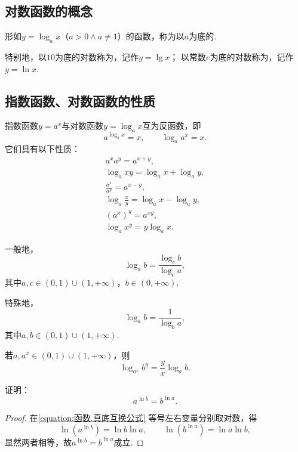 \subsection{对数函数的概念}
\begin{definition}[对数函数]
形如\(y=\log_a x\)（\(a>0 \land a \neq 1\)）的函数，称为以\(a\)为底的.

特别地，以\(10\)为底的对数称为，记作\(y = \lg x\)；
以常数\(e\)为底的对数称为，记作\(y = \ln x\).
\end{definition}

\subsection{指数函数、对数函数的性质}
\begin{property}
指数函数\(y = a^x\)与对数函数\(y = \log_a x\)互为反函数，即\[
	a^{\log_a x} = x, \qquad
	\log_a a^x = x.
\]
它们具有以下性质：
\begin{gather}
	a^x a^y = a^{x+y}, \\
	\log_a xy = \log_a x + \log_a y, \\
	\frac{a^x}{a^y} = a^{x-y}, \\
	\log_a \frac{x}{y} = \log_a x - \log_a y, \\
	(a^x)^y = a^{xy}, \\
	\log_a x^y = y \log_a x.
\end{gather}
\end{property}

\begin{theorem}[换底公式]
一般地，\[
\log_a b = \frac{\log_c b}{\log_c a},
\]其中\(a,c\in(0,1)\cup(1,+\infty)\)，\(b\in(0,+\infty)\).

特殊地，\[
\log_a b = \frac{1}{\log_b a},
\]其中\(a,b\in(0,1)\cup(1,+\infty)\).
\end{theorem}

\begin{corollary}
若\(a,a^x \in (0,1)\cup(1,+\infty)\)，则\[
\log_{a^x} b^y = \frac{y}{x} \log_a b.
\]
\end{corollary}

\begin{example}
证明：\begin{equation}\label{equation:函数.真底互换公式}
a^{\ln b} = b^{\ln a}.
\end{equation}
\begin{proof}
在\cref{equation:函数.真底互换公式} 等号左右变量分别取对数，得\[
\ln(a^{\ln b}) = \ln b \ln a, \qquad
\ln(b^{\ln a}) = \ln a \ln b,
\]显然两者相等，故\(a^{\ln b} = b^{\ln a}\)成立.
\end{proof}
\end{example}

